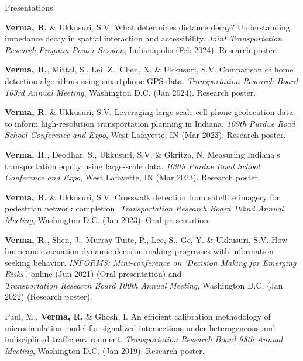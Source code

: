 \documentclass{CV} %
\begin{document}
\begin{rSection}{Presentations}
\begin{etaremune}
        \item \textbf{Verma, R.} \& Ukkusuri, S.V. What determines distance decay? Understanding impedance decay in spatial interaction and accessibility. \textit{Joint Transportation Research Program Poster Session}, Indianapolis (Feb 2024). Research poster.

        \item \textbf{Verma, R.}, Mittal, S., Lei, Z., Chen, X. \& Ukkusuri, S.V. Comparison of home detection algorithms using smartphone GPS data. \textit{Transportation Research Board 103rd Annual Meeting}, Washington D.C. (Jan 2024). Research poster.

        \item \textbf{Verma, R.} \& Ukkusuri, S.V. Leveraging large-scale cell phone geolocation data to inform high-resolution transportation planning in Indiana. \textit{109th Purdue Road School Conference and Expo}, West Lafayette, IN (Mar 2023). Research poster.

        \item \textbf{Verma, R.}, Deodhar, S., Ukkusuri, S.V. \& Gkritza, N. Measuring Indiana's transportation equity using large-scale data. \textit{109th Purdue Road School Conference and Expo}, West Lafayette, IN (Mar 2023). Research poster.

        \item \textbf{Verma, R.} \& Ukkusuri, S.V. Crosswalk detection from satellite imagery for pedestrian network completion. \textit{Transportation Research Board 102nd Annual Meeting}, Washington D.C. (Jan 2023). Oral presentation.

        \item \textbf{Verma, R.}, Shen, J., Murray-Tuite, P., Lee, S., Ge, Y. \& Ukkusuri, S.V. How hurricane evacuation dynamic decision-making progresses with information-seeking behavior. \textit{INFORMS: Mini-conference on `Decision Making for Emerging Risks'}, online (Jun 2021) (Oral presentation) and
        \\ \textit{Transportation Research Board 100th Annual Meeting}, Washington D.C. (Jan 2022) (Research poster).
    
        \item Paul, M., \textbf{Verma, R.} \& Ghosh, I. An efficient calibration methodology of microsimulation model for signalized intersections under heterogeneous and indisciplined traffic environment. \textit{Transportation Research Board 98th Annual Meeting}, Washington D.C. (Jan 2019). Research poster.
        

\end{etaremune}
\end{rSection}
\end{document}
